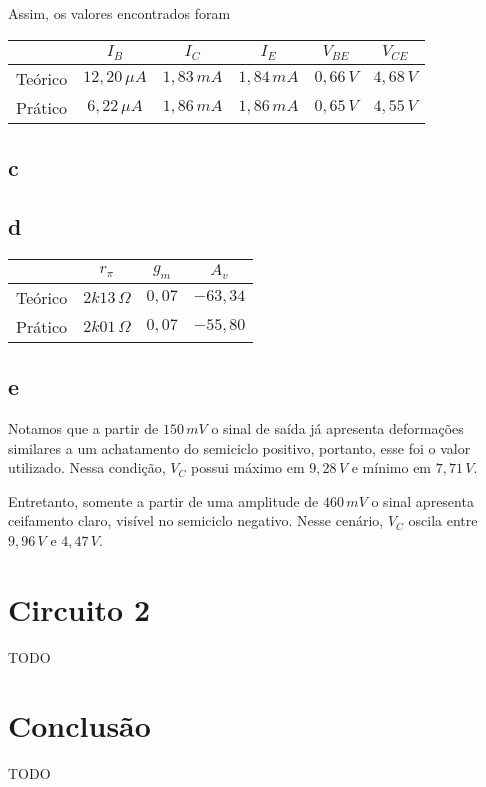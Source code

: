 \documentclass[a4paper]{report}
\begin{document}
Assim, os valores encontrados foram
\begin{table}[H]
    \centering
    \begin{tabular}{c | c | c | c | c | c}
	 & $I_B$ & $I_C$ & $I_E$ & $V_{BE}$ & $V_{CE}$ \\
	 \hline
	Teórico & $12,20\,\mu A$ & $1,83\,mA$ & $1,84\,mA$ & $0,66\,V$ & $4,68\,V$ \\
	Prático & $6,22\,\mu A$ & $1,86\,mA$ & $1,86\,mA$ & $0,65\,V$ & $4,55\,V$
    \end{tabular}
\end{table}

\subsection*{c}

\subsection*{d}

\begin{table}[H]
    \centering
    \begin{tabular}{c | c | c | c}
     & $r_\pi$ & $g_m$ & $A_v$ \\
     \hline
	Teórico & $2k13\,\Omega$ & $0,07$ & $-63,34$ \\
	Prático & $2k01\,\Omega$ & $0,07$ & $-55,80$
    \end{tabular}
\end{table}

\subsection*{e}

Notamos que a partir de $150\,mV$ o sinal de saída já apresenta deformações similares a um achatamento do semiciclo positivo, portanto, esse foi o valor utilizado. Nessa condição, $V_C$ possui máximo em $9,28\,V$ e mínimo em $7,71\,V$.

Entretanto, somente a partir de uma amplitude de $460\,mV$ o sinal apresenta ceifamento claro, visível no semiciclo negativo. Nesse cenário, $V_C$ oscila entre $9,96\,V$ e $4,47\,V$.

\section*{Circuito 2}

TODO

\section{Conclusão}

TODO
\end{document}
